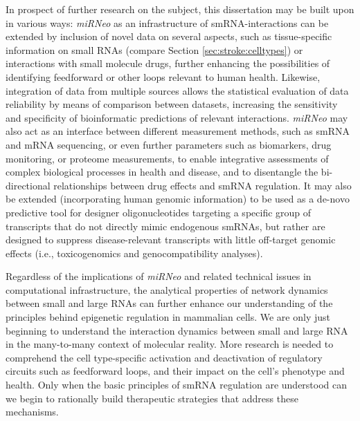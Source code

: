 In prospect of further research on the subject, this dissertation may be built upon in various ways: \emph{miRNeo} as an infrastructure of smRNA-interactions can be extended by inclusion of novel data on several aspects, such as tissue-specific information on small RNAs (compare Section \ref{sec:stroke:celltypes}) or interactions with small molecule drugs, further enhancing the possibilities of identifying feedforward or other loops relevant to human health. Likewise, integration of data from multiple sources allows the statistical evaluation of data reliability by means of comparison between datasets, increasing the sensitivity and specificity of bioinformatic predictions of relevant interactions. \emph{miRNeo} may also act as an interface between different measurement methods, such as smRNA and mRNA sequencing, or even further parameters such as biomarkers, drug monitoring, or proteome measurements, to enable integrative assessments of complex biological processes in health and disease, and to disentangle the bi-directional relationships between drug effects and smRNA regulation. It may also be extended (incorporating human genomic information) to be used as a de-novo predictive tool for designer oligonucleotides targeting a specific group of transcripts that do not directly mimic endogenous smRNAs, but rather are designed to suppress disease-relevant transcripts with little off-target genomic effects (i.e., toxicogenomics and genocompatibility analyses).

Regardless of the implications of \emph{miRNeo} and related technical issues in computational infrastructure, the analytical properties of network dynamics between small and large RNAs can further enhance our understanding of the principles behind epigenetic regulation in mammalian cells. We are only just beginning to understand the interaction dynamics between small and large RNA in the many-to-many context of molecular reality. More research is needed to comprehend the cell type-specific activation and deactivation of regulatory circuits such as feedforward loops, and their impact on the cell's phenotype and health. Only when the basic principles of smRNA regulation are understood can we begin to rationally build therapeutic strategies that address these mechanisms. 